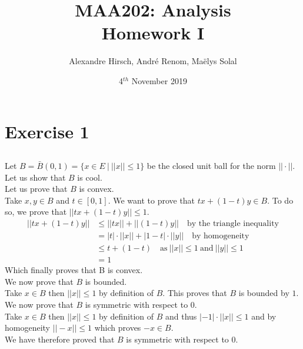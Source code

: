 \documentclass{article}
\title{MAA202: Analysis\\Homework I}
\date{4$^{th}$ November 2019}
\author{Alexandre Hirsch, Andr\'e Renom, Ma\"elys Solal}
\begin{document}
	\maketitle

	\tableofcontents
	\newpage
	\renewcommand{\thesubsubsection}{\thesubsection.\alph{subsubsection}}

\section{Exercise 1}
\subsection{} %

Let $B = \bar{B}(0,1) = \{x \in E \ | \ ||x|| \leq 1\}$ be the closed unit ball for the norm $||\cdot||$. Let us show that $B$ is cool. \\

\noindent Let us prove that $B$ is convex. \\
Take $x, y \in B$ and $t \in [0, 1]$. We want to prove that $tx + (1-t)y \in B$. To do so, we prove that $||tx + (1-t)y|| \leq 1$. 
\begin{align*}
 	||tx + (1-t)y|| &\leq ||tx|| + ||(1-t)y|| \quad \text{by the triangle inequality} \\
	&= |t|\cdot ||x|| + |1-t|\cdot ||y|| \quad \text{by homogeneity} \\
	&\leq t + (1-t) \quad \text{as} \  ||x|| \leq 1 \  \text{and} \  ||y|| \leq 1 \\
	&= 1 
\end{align*}
Which finally proves that B is convex. \\

\noindent We now prove that $B$ is bounded. \\
Take $x \in B$ then $||x|| \leq 1$ by definition of $B$. This proves that $B$ is bounded by $1$. \\

\noindent We now prove that $B$ is symmetric with respect to $0$. \\
Take $x \in B$ then $||x|| \leq 1$ by definition of $B$ and thus $|-1|\cdot||x|| \leq 1$ and by homogeneity $||-x|| \leq 1$ which proves $-x \in B$. \\
We have therefore proved that $B$ is symmetric with respect to $0$. \\
\end{document}
